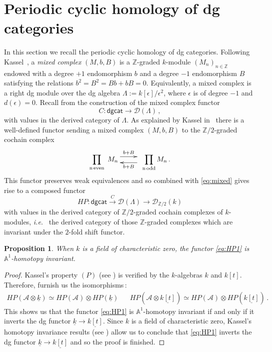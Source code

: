 \documentclass{amsart}
\numberwithin{equation}{subsection}
\newtheorem{proposition}[theorem]{Proposition}
\theoremstyle{remark}
\theoremstyle{remark}
\theoremstyle{remark}
\theoremstyle{remark}
\begin{document}
\section{Periodic cyclic homology of dg categories}\label{sec:HP}
In this section we recall the periodic cyclic homology of dg categories. Following Kassel~\cite[\S1]{Kassel}, a {\em mixed complex} $(M,b,B)$ is a ${\mathbb{Z}}$-graded $k$-module $(M_n)_{n \in {\mathbb{Z}}}$ endowed with a degree $+1$ endomorphism $b$ and a degree $-1$ endomorphism $B$ satisfying the relations $b^2=B^2=Bb +bB=0$. Equivalently, a mixed complex is a right dg module over the dg algebra $\Lambda:=k[\epsilon]/\epsilon^2$, where $\epsilon$ is of degree $-1$ and $d(\epsilon)=0$. Recall from \cite[Example~7.10]{CT1} the construction of the mixed complex functor
\begin{equation}\label{eq:mixed}
C: {\mathsf{dgcat}} {\longrightarrow} {{\mathcal D}}(\Lambda)\,,
\end{equation}
with values in the derived category of $\Lambda$. As explained by Kassel in~\cite[page~210]{Kassel} there is a well-defined functor sending a mixed complex $(M,b,B)$ to the ${\mathbb{Z}}/2$-graded cochain complex
$$
\prod_{\mathrm{n\,even}} \xymatrix{M_n \ar@<1ex>[r]^-{b+B} & \ar@<1ex>[l]^-{b+B}}  \prod_{\mathrm{n\,odd}} M_n \,.
$$
This functor preserves weak equivalences and so combined with \eqref{eq:mixed} gives rise to a composed functor
\begin{equation}\label{eq:HP1}
HP: {\mathsf{dgcat}} \stackrel{C}{\longrightarrow} {{\mathcal D}}(\Lambda) {\longrightarrow} {{\mathcal D}}_{{\mathbb{Z}}/2}(k)
\end{equation}
with values in the derived category of ${\mathbb{Z}}/2$-graded cochain complexes of $k$-modules, {\textsl{i.e.}\ } the derived category of those ${\mathbb{Z}}$-graded complexes which are invariant under the $2$-fold shift functor. 
\newpage
\begin{proposition}
When $k$ is a field of characteristic zero, the functor \eqref{eq:HP1} is ${\mathbb{A}}^1$-homotopy invariant.
\end{proposition}
\begin{proof}
Kassel's property $(P)$ (see \cite[page~211]{Kassel}) is verified by the $k$-algebras $k$ and $k[t]$. Therefore, \cite[Theorem~3.10]{Kassel} furnish us the isomorphisms\,:
\begin{eqnarray*}
HP({{\mathcal A}} \otimes \underline{k}) \simeq HP({{\mathcal A}}) \otimes HP(\underline{k}) && HP({{\mathcal A}} \otimes \underline{k[t]}) \simeq HP({{\mathcal A}}) \otimes HP(\underline{k[t]})\,.
\end{eqnarray*}
This shows us that the functor \eqref{eq:HP1} is ${\mathbb{A}}^1$-homotopy invariant if and only if it inverts the dg functor $\underline{k} \to \underline{k[t]}$. Since $k$ is a field of characteristic zero, Kassel's homotopy invariance results (see \cite[Corollary 3.12 and (3.13)]{Kassel}) allow us to conclude that \eqref{eq:HP1} inverts the dg functor $\underline{k} \to \underline{k[t]}$ and so the proof is finished.
\end{proof}
\end{document}
